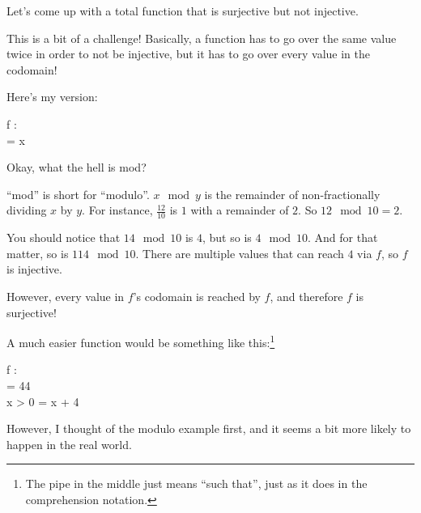 \begin{example}
    Let's come up with a total function that is surjective but not injective.

    This is a bit of a challenge! Basically, a function has to go over the same
    value twice in order to not be injective, but it has to go over every value
    in the codomain!

    Here's my version:

    \begin{alignedmath}
        f : \N \to {} \\
         = x  \\
    \end{alignedmath}

    Okay, what the hell is mod?

    ``mod'' is short for ``modulo''. $x \mod y$ is the remainder of
    non-fractionally dividing $x$ by $y$. For instance, $\frac{12}{10}$ is $1$
    with a remainder of $2$. So $12 \mod{10} = 2$.

    You should notice that $14 \mod{10}$ is $4$, but so is $4 \mod{10}$. And for
    that matter, so is $114 \mod{10}$. There are multiple values that can reach
    $4$ via $f$, so $f$ is  injective.

    However, every value in $f$'s codomain is reached by $f$, and therefore $f$
    is surjective!

    A much easier function would be something like this:\footnote{The pipe in
      the middle just means ``such that'', just as it does in the comprehension
      notation.}

    \begin{alignedmath}
        f : \N \to \N \\
         = 44 \\
         \mid x > 0 = x + 4 \\
    \end{alignedmath}

    However, I thought of the modulo example first, and it seems a bit more
    likely to happen in the real world.
\end{example}

